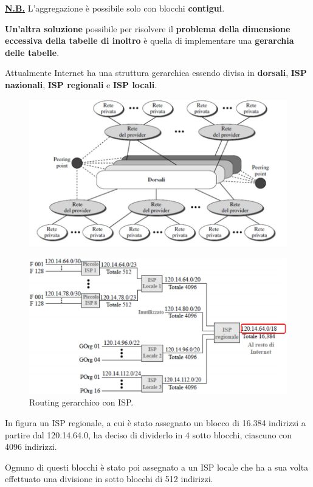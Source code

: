 \documentclass[11pt,a4paper,oneside]{book}
\theoremstyle{definition}
\begin{document}
\textbf{\underline{N.B.}} L'aggregazione è possibile solo con blocchi \textbf{contigui}.

\pagebreak
\textbf{Un'altra soluzione} possibile per risolvere il \textbf{problema della dimensione eccessiva della tabelle di inoltro} è quella di implementare una \textbf{gerarchia delle tabelle}.

Attualmente Internet ha una struttura gerarchica essendo divisa in \textbf{dorsali}, \textbf{ISP nazionali}, \textbf{ISP regionali} e \textbf{ISP locali}.

\begin{figure}[!h]
	\includegraphics[scale=0.55]{Immagini/Internet_Concept.png}
	\centering
\end{figure}

\begin{figure}[!h]
	\includegraphics[scale=0.35]{Immagini/Ip_g_add.png}
	\centering
	\caption{Routing gerarchico con ISP.}
\end{figure}

In figura un ISP regionale, a cui è stato assegnato un blocco di 16.384 indirizzi a partire dal 120.14.64.0,  ha deciso di dividerlo in 4 sotto blocchi, ciascuno con
4096 indirizzi.

Ognuno di questi blocchi è stato poi assegnato a un ISP locale che ha a sua volta effettuato una divisione in sotto blocchi di 512 indirizzi.
\end{document}
